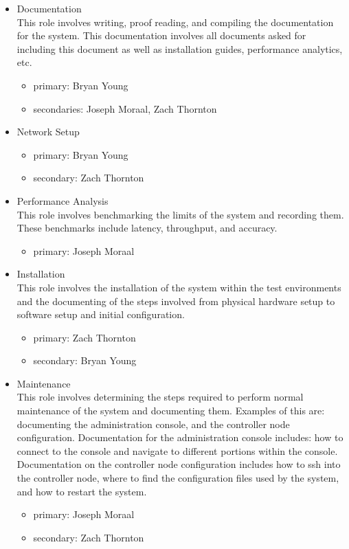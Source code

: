 \documentclass[11pt,a4paper]{article}
\begin{document}
\begin{itemize}
\begin{itemize}
    \end{itemize}
    \item{Documentation} \\
    This role involves writing, proof reading, and compiling the documentation for the system.  This documentation involves all documents asked for including this document as well as installation guides, performance analytics, etc.
    \begin{itemize}
        \item{primary: Bryan Young}
        \item{secondaries: Joseph Moraal, Zach Thornton}
    \end{itemize}
    \item{Network Setup}
    \begin{itemize}
        \item{primary: Bryan Young}
        \item{secondary: Zach Thornton}
    \end{itemize}
    \item{Performance Analysis} \\
    This role involves benchmarking the limits of the system and recording them.  These benchmarks include latency, throughput, and accuracy. 
    \begin{itemize}
        \item{primary: Joseph Moraal}
    \end{itemize}
    \item{Installation} \\
    This role involves the installation of the system within the test environments and the documenting of the steps involved from physical hardware setup to software setup and initial configuration.
    \begin{itemize}
        \item{primary: Zach Thornton}
        \item{secondary: Bryan Young}
    \end{itemize}
    \item{Maintenance} \\
    This role involves determining the steps required to perform normal maintenance of the system and documenting them.  Examples of this are: documenting the administration console, and the controller node configuration.  Documentation for the administration console includes: how to connect to the console and navigate to different portions within the console.  Documentation on the controller node configuration includes how to ssh into the controller node, where to find the configuration files used by the system, and how to restart the system.
    \begin{itemize}
        \item{primary: Joseph Moraal}
        \item{secondary: Zach Thornton}
    \end{itemize}
\end{itemize}
\end{document}
